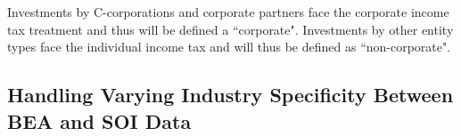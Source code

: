 \documentclass[article,11pt,letterpaper,fleqn]{article}
\theoremstyle{definition}
\numberwithin{equation}{section}
\begin{document}
Investments by C-corporations and corporate partners face the corporate income tax treatment and thus will be defined a ``corporate".  Investments by other entity types face the individual income tax and will thus be defined as ``non-corporate".

%
%


\subsection{Handling Varying Industry Specificity Between BEA and SOI Data}
\end{document}
